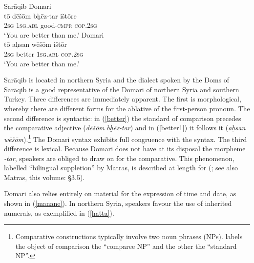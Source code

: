 \documentclass[output=paper]{langsci/langscibook}
\begin{document}
\ea
{Sarāqib Domari}\\ \label{better}
\gll tō dēšōm bḫēz-tar ištōre\\
     \textsc{2sg} \textsc{1sg.abl} good\textsc{-cmpr} \textsc{cop.2sg}\\
\glt ‘You are better than me.’
\ex 
{ Domari}\\ \label{better1}
\gll tō aḥsan wēšōm ištōr\\
 \textsc{2sg} better \textsc{1sg.abl} \textsc{cop.2sg} \\
\glt ‘You are better than me.’\\
\z

Sarāqib is located in northern Syria and the dialect spoken by the Doms of Sarāqib is a good representative of the Domari of northern Syria and southern Turkey. Three differences are immediately apparent. The first is morphological, whereby there are different forms for the ablative of the first-person pronoun. The second difference is syntactic: in (\ref{better}) the standard of comparison precedes the {comparative} adjective (\textit{dēšōm} \textit{bḫēz-tar}) and in (\ref{better1}) it follows it (\textit{aḥsan} \textit{wēšōm}).\footnote{Comparative constructions typically involve two noun phrases (NPs). \citet{Stassen2013} labels the object of comparison the “comparee NP” and the other the “standard NP”.} The  Domari syntax exhibits full congruence with the  syntax. The third difference is lexical. Because  Domari does not have at its disposal the morpheme \textit{{}-tar}, speakers are obliged to draw on  for the {comparative}. This phenomenon, labelled ``{bilingual suppletion}'' by Matras, is described at length for  (\citealt[379--382]{Matras2012}; see also Matras, this volume: §3.5).

 Domari also relies entirely on  material for the expression of time and date, as shown in (\ref{manane}). In northern Syria, speakers favour the use of inherited {numerals}, as exemplified in (\ref{hatta}).
\end{document}

